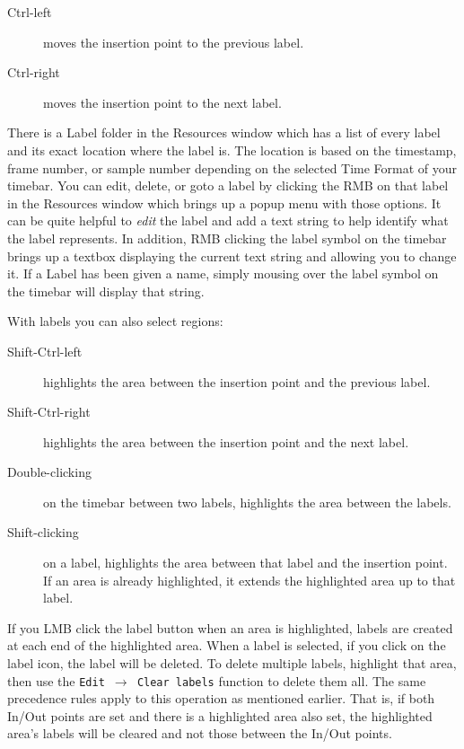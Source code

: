 \begin{description}
    \item[Ctrl-left] moves the insertion point to the previous label.
    \item[Ctrl-right] moves the insertion point to the next label.
\end{description}

There is a  Label folder in the Resources window which has a list of every label and its exact location
where the label is. The location is based on the timestamp, frame number, or sample number depending on the selected Time Format of your timebar. 
You can edit, delete, or goto a label by clicking the RMB on that label in the Resources window which
brings up a popup menu with those options.  It can be quite helpful to \textit{edit} the label
and add a text string to help identify what the label represents.
In addition, RMB clicking the label symbol on the timebar brings up a textbox displaying the current
text string and allowing you to change it. If a Label has been given a name, simply mousing over
the label symbol on the timebar will display that string.

With labels you can also select regions:

\begin{description}
    \item[Shift-Ctrl-left] highlights the area between the insertion point and the previous label.
    \item[Shift-Ctrl-right] highlights the area between the insertion point and the next label.
    \item[Double-clicking] on the timebar between two labels, highlights the area between the labels.	   
    \item[Shift-clicking] on a label, highlights the area between that label and the insertion point.
        If an area is already highlighted, it extends the highlighted area up to that label.
\end{description}

If you LMB click the label button when an area is highlighted, labels are created at each end of the
highlighted area. 
When a label is selected, if you click on the label icon, the label will be deleted. 
To delete multiple labels, highlight that area, then use the \texttt{Edit $\rightarrow$ Clear labels}
function to delete them all. The same precedence rules apply to this operation as mentioned earlier.  That
is, if both In/Out points are set and there is a highlighted area also set, the highlighted area's 
labels will be cleared and not those between the In/Out points.

